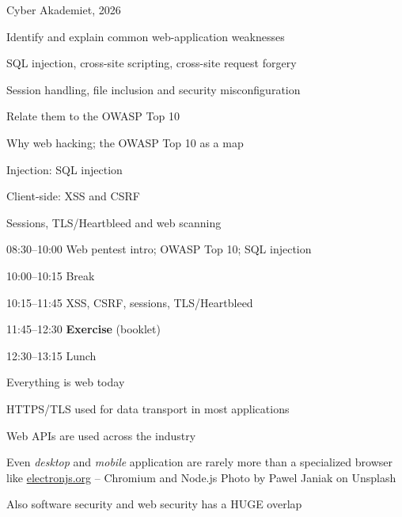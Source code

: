 \documentclass[Screen16to9,17pt]{foils}
\begin{document}
{Cyber Akademiet, 2026}

\begin{list2}
\item Identify and explain common web-application weaknesses
\item SQL injection, cross-site scripting, cross-site request forgery
\item Session handling, file inclusion and security misconfiguration
\item Relate them to the OWASP Top 10
\end{list2}

\begin{list2}
\item Why web hacking; the OWASP Top 10 as a map
\item Injection: SQL injection
\item Client-side: XSS and CSRF
\item Sessions, TLS/Heartbleed and web scanning
\end{list2}

\begin{list2}
\item 08:30--10:00 Web pentest intro; OWASP Top 10; SQL injection
\item 10:00--10:15 Break
\item 10:15--11:45 XSS, CSRF, sessions, TLS/Heartbleed
\item 11:45--12:30 \textbf{Exercise} (booklet)
\item 12:30--13:15 Lunch
\end{list2}



\begin{list2}
\item Everything is web today
\item HTTPS/TLS used for data transport in most applications
\item Web APIs are used across the industry
\item Even \emph{desktop} and \emph{mobile} application are rarely more than a specialized browser\\ like \url{electronjs.org} -- Chromium and Node.js
\hfill {\footnotesize Photo by Pawel Janiak on Unsplash}
\item Also software security and web security has a HUGE overlap
\end{list2}
\end{document}
